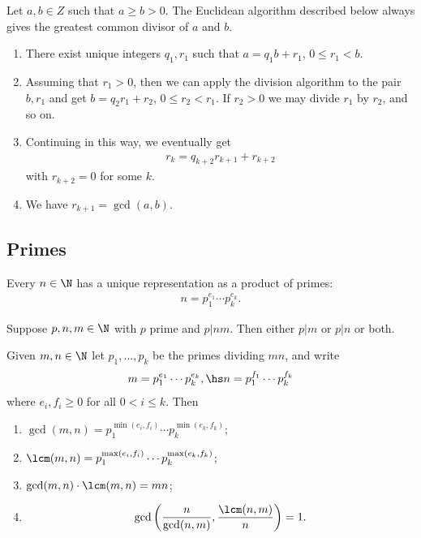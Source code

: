\documentclass{article}
\begin{document}
\begin{theorem}
    Let $a,b\in Z$ such that $a\geq b>0$.
    The Euclidean algorithm described below always gives the greatest common divisor of
    $a$ and $b$.
    \begin{enumerate}
        \item There exist unique integers $q_1,r_1$ such that $a=q_1b+r_1$, $0\leq r_1<b$.
        \item Assuming that $r_1>0$, then we can apply the division algorithm to the pair
              $b,r_1$ and get $b=q_2r_1 + r_2$, $0\leq r_2<r_1$. If $r_2>0$ we may divide
              $r_1$ by $r_2$, and so on.
        \item Continuing in this way, we eventually get \begin{align*}
                  r_k=q_{k+2}r_{k+1}+r_{k+2}
              \end{align*}
              with $r_{k+2}=0$ for some $k$.
        \item We have $r_{k+1}=\gcd(a,b)$.
    \end{enumerate}
\end{theorem}

\subsection{Primes}

\begin{theorem}
    Every $n\in\N$ has a unique representation as a product of primes:
    \begin{align*}
        n = p_1^{e_1}\cdots p_k^{e_k}.
    \end{align*}
\end{theorem}

\begin{proposition}[Boocher 2.3]
    Suppose $p,n,m\in\N$ with $p$ prime and $p|nm$. Then either $p|m$ or $p|n$ or both.
\end{proposition}

\begin{proposition}[Boocher 3.2]
    Given $m,n\in\N$ let $p_1,...,p_k$ be the primes dividing $mn$, and write 
    \begin{align*}
        m = p_1^{e_1}\cdots p_k^{e_k}, \hs n = p_1^{f_1}\cdots p_k^{f_k}
    \end{align*}
    where $e_i,f_i\geq 0$ for all $0<i\leq k$. Then 
    \begin{enumerate}
        \item $\gcd(m,n)=p_1^{\min(e_i,f_i)}\cdots p_k^{\min(e_k,f_k)}$;
        \item $\lcm(m,n)=p_1^{\max(e_i,f_i)}\cdots p_k^{\max(e_k,f_k)}$;
        \item $\gcd(m,n)\cdot\lcm(m,n)=mn$;
        \item \begin{align*}
            \gcd\left(\frac{n}{\gcd(n,m)},\frac{\lcm(n,m)}{n}\right)=1.
        \end{align*}
    \end{enumerate}
\end{proposition}
\end{document}
